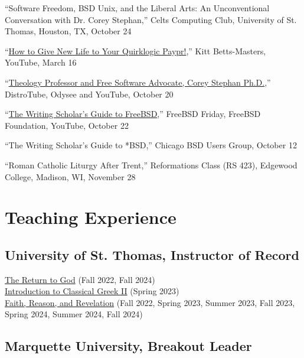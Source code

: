 \documentclass[letterpaper,12pt]{article}
\newcommand{\years}[1]{%
  {\reversemarginpar\strut\marginnote{{\small#1}}}%
}
\begin{document}
{{{{{{{{\years{2023}%
%
``Software Freedom, BSD Unix, and the Liberal Arts: An Unconventional Conversation with Dr. Corey Stephan,'' Celts Computing Club, University of St. Thomas, Houston, TX, October 24 \\ [.3cm]
%
\years{2023}%
%
``\href{https://www.youtube.com/watch?v=_IBIjZKasjQ}{How to Give New Life to Your Quirklogic Paypr!},'' Kitt Betts-Masters, YouTube, March 16 \\ [.3cm]
%
\years{2022}%
%
``\href{https://odysee.com/@DistroTube:2/theology-professor-and-free-software:b}{Theology Professor and Free Software Advocate, Corey Stephan Ph.D.},'' DistroTube, Odysee and YouTube, October 20 \\ [.3cm]
%
\years{2021}%
%
``\href{https://www.youtube.com/watch?v=BYTNpuinaPU}{The Writing Scholar’s Guide to FreeBSD},'' FreeBSD Friday, FreeBSD Foundation, YouTube, October 22 \\ [.3cm]
%
\years{2021}%
%
``The Writing Scholar’s Guide to *BSD,'' Chicago BSD Users Group, October 12 \\ [.3cm]
%
\years{2017}%
%
``Roman Catholic Liturgy After Trent,'' Reformations Class (RS 423), Edgewood College, Madison, WI, November 28

\section*{Teaching Experience}

\subsection*{University of St. Thomas, Instructor of Record}

\href{https://www.coreystephan.com/teaching/return-to-god/}{The Return to God} (Fall 2022, Fall 2024) \\ [.3cm]
%
\href{https://www.coreystephan.com/teaching/greek/}{Introduction to Classical Greek II} (Spring 2023) \\ [.3cm]
%
\href{https://www.coreystephan.com/teaching/faith-reason-revelation/}{Faith, Reason, and Revelation} (Fall 2022, Spring 2023, Summer 2023, Fall 2023, Spring 2024, Summer 2024, Fall 2024)

\subsection*{Marquette University, Breakout Leader}

}}}}}}}}
\end{document}
